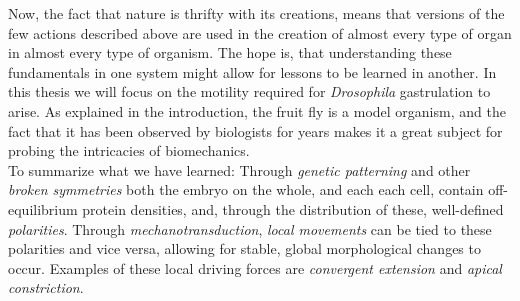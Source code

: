 Now, the fact that nature is thrifty with its creations, means that versions of the few actions described above are used in the creation of almost every type of organ in almost every type of organism. The hope is, that understanding these fundamentals in one system might allow for lessons to be learned in another. In this thesis we will focus on the motility required for \textit{Drosophila} gastrulation to arise. As explained in the introduction, the fruit fly is a model organism, and the fact that it has been observed by biologists for years makes it a great subject for probing the intricacies of biomechanics.\\



To summarize what we have learned:
Through \textit{genetic patterning} and other \textit{broken symmetries} both the embryo on the whole, and each each cell, contain off-equilibrium protein densities, and, through the distribution of these, well-defined \textit{polarities}.
Through \textit{mechanotransduction}, \textit{local movements} can be tied to these polarities and vice versa, allowing for stable, global morphological changes to occur. Examples of these local driving forces are \textit{convergent extension} and \textit{apical constriction}.





